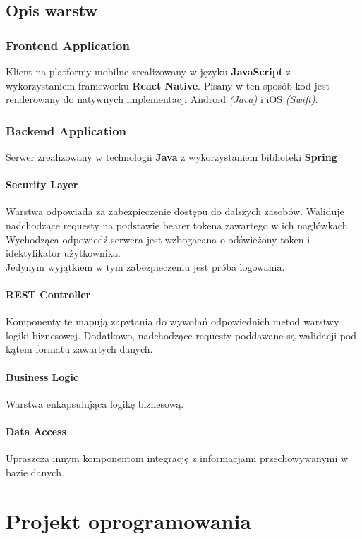 \documentclass[oneside]{scrreprt}
\begin{document}
\section{Opis warstw}
\subsection{Frontend Application}
Klient na platformy mobilne zrealizowany w języku \textbf{JavaScript} z wykorzystaniem frameworku \textbf{React Native}.
Pisany w ten sposób kod jest renderowany do natywnych implementacji Android \textit{(Java)} i iOS \textit{(Swift)}.

\subsection{Backend Application}
Serwer zrealizowany w technologii \textbf{Java} z wykorzystaniem biblioteki \textbf{Spring}

\subsubsection{Security Layer}
Warstwa odpowiada za zabezpieczenie dostępu do dalszych zasobów. 
Waliduje nadchodzące requesty na podstawie bearer tokena zawartego w ich nagłówkach.
Wychodząca odpowiedź serwera jest wzbogacana o odświeżony token i idektyfikator użytkownika.\\
Jedynym wyjątkiem w tym zabezpieczeniu jest próba logowania.

\subsubsection{REST Controller}
Komponenty te mapują zapytania do wywołań odpowiednich metod warstwy logiki biznesowej. 
Dodatkowo, nadchodzące requesty poddawane są walidacji pod kątem formatu zawartych danych.

\subsubsection{Business Logic}
Warstwa enkapsulująca logikę biznesową.

\subsubsection{Data Access}
Upraszcza innym komponentom integrację z informacjami przechowywanymi w bazie danych. 

\chapter{Projekt oprogramowania}
\end{document}
